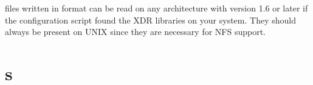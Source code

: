 {\gromacs} files written in  format can be read on any
architecture with {\gromacs} version 1.6 or later if the configuration
script found the XDR libraries on your system. They should always be
present on UNIX since they are necessary for NFS support.



\section{s}


\section{}


